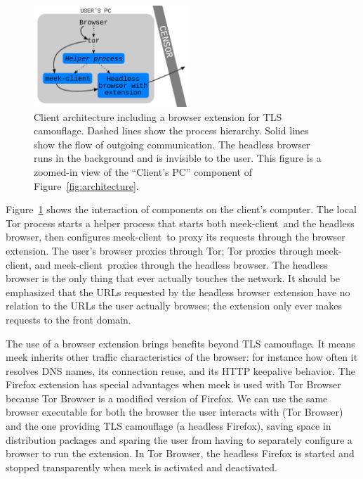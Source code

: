\documentclass[conference]{IEEEtran}
\def\meekclient{\mbox{meek-client}}
\begin{document}
\begin{figure}
\centering
\includegraphics[height=1.5in]{browser-architecture}
\caption{
Client architecture including a browser extension for TLS camouflage.
Dashed lines show the process hierarchy.
Solid lines show the flow of outgoing communication.
The headless browser runs in the background and is invisible to the user.
This figure is a zoomed-in view of the ``Client's PC'' component of Figure~\ref{fig:architecture}.
}
\label{fig:browser-architecture}
\end{figure}

Figure~\ref{fig:browser-architecture} shows the interaction of components
on the client's computer.
The local Tor process starts a helper process that starts both \meekclient\
and the headless browser,
then configures \meekclient\ to proxy its requests through the browser extension.
The user's browser proxies through Tor;
Tor proxies through \meekclient,
and \meekclient\ proxies through the headless browser.
The headless browser is the only thing that ever actually touches the network.
It should be emphasized that the URLs requested by the headless browser extension
have no relation to the URLs the user actually browses;
the extension only ever makes requests to the front domain.

The use of a browser extension brings benefits beyond TLS camouflage.
It means meek inherits other traffic characteristics of the browser:
for instance
how often it resolves DNS names,
its connection reuse,
and its HTTP keepalive behavior.
The Firefox extension has special advantages
when meek is used with Tor Browser
because Tor Browser
is a modified version of Firefox.
We can use the same browser executable for both the browser the user interacts with (Tor Browser)
and the one providing TLS camouflage (a headless Firefox),
saving space in distribution packages
and sparing the user from having to separately configure a browser to run the extension.
In Tor Browser,
the headless Firefox is started and stopped transparently
when meek is activated and deactivated.

\end{document}

